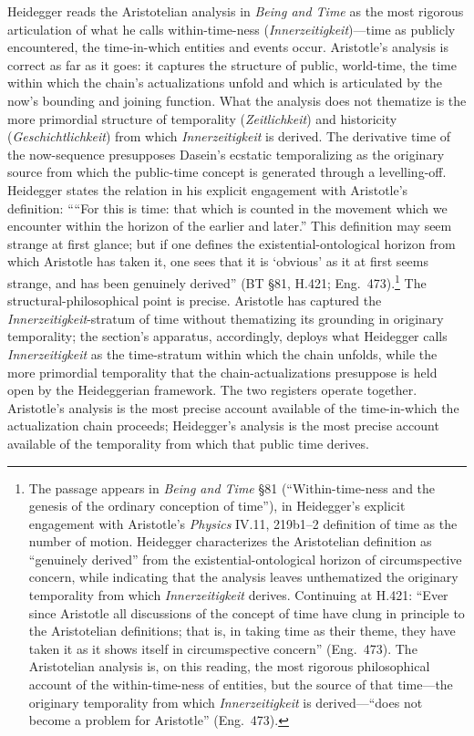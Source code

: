 \documentclass{article}
\begin{document}
Heidegger reads the Aristotelian analysis in \textit{Being and Time} as the most rigorous articulation of what he calls within-time-ness (\textit{Innerzeitigkeit})---time as publicly encountered, the time-in-which entities and events occur. Aristotle's analysis is correct as far as it goes: it captures the structure of public, world-time, the time within which the chain's actualizations unfold and which is articulated by the now's bounding and joining function. What the analysis does not thematize is the more primordial structure of temporality (\textit{Zeitlichkeit}) and historicity (\textit{Geschichtlichkeit}) from which \textit{Innerzeitigkeit} is derived. The derivative time of the now-sequence presupposes Dasein's ecstatic temporalizing as the originary source from which the public-time concept is generated through a levelling-off. Heidegger states the relation in his explicit engagement with Aristotle's definition: ````For this is time: that which is counted in the movement which we encounter within the horizon of the earlier and later.'' This definition may seem strange at first glance; but if one defines the existential-ontological horizon from which Aristotle has taken it, one sees that it is `obvious' as it at first seems strange, and has been genuinely derived'' (BT \S 81, H.421; Eng.~473).\footnote{The passage appears in \textit{Being and Time} \S 81 (``Within-time-ness and the genesis of the ordinary conception of time''), in Heidegger's explicit engagement with Aristotle's \textit{Physics} IV.11, 219b1--2 definition of time as the number of motion. Heidegger characterizes the Aristotelian definition as ``genuinely derived'' from the existential-ontological horizon of circumspective concern, while indicating that the analysis leaves unthematized the originary temporality from which \textit{Innerzeitigkeit} derives. Continuing at H.421: ``Ever since Aristotle all discussions of the concept of time have clung in principle to the Aristotelian definitions; that is, in taking time as their theme, they have taken it as it shows itself in circumspective concern'' (Eng.~473). The Aristotelian analysis is, on this reading, the most rigorous philosophical account of the within-time-ness of entities, but the source of that time---the originary temporality from which \textit{Innerzeitigkeit} is derived---``does not become a problem for Aristotle'' (Eng.~473).} The structural-philosophical point is precise. Aristotle has captured the \textit{Innerzeitigkeit}-stratum of time without thematizing its grounding in originary temporality; the section's apparatus, accordingly, deploys what Heidegger calls \textit{Innerzeitigkeit} as the time-stratum within which the chain unfolds, while the more primordial temporality that the chain-actualizations presuppose is held open by the Heideggerian framework. The two registers operate together. Aristotle's analysis is the most precise account available of the time-in-which the actualization chain proceeds; Heidegger's analysis is the most precise account available of the temporality from which that public time derives.
\end{document}
